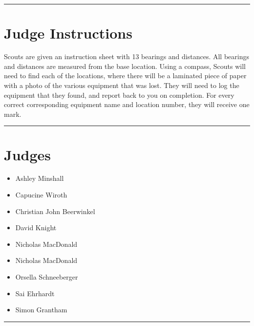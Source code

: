 \documentclass[10pt]{article}
\begin{document}
	\vspace{0.5cm}
	\hrule
	\vspace{0.5cm}

		\section*{Judge Instructions}
		Scouts are given an instruction sheet with 13 bearings and distances. All bearings and distances are measured from the base location. Using a compass, Scouts will need to find each of the locations, where there will be a laminated piece of paper with a photo of the various equipment that was lost. They will need to log the equipment that they found, and report back to you on completion. For every correct corresponding equipment name and location number, they will receive one mark.
\vspace{0.5cm}
	\hrule
	\vspace{0.5cm}
		\section*{\faUsers \: Judges}

		

	\begin{multicols}{2}

		\begin{itemize}
									\item Ashley Minshall
									\item Capucine Wiroth
									\item Christian John Beerwinkel
									\item David Knight
									\item Nicholas MacDonald
						\end{itemize}

		\vfill\null
		\columnbreak

		\begin{itemize}
									\item Nicholas MacDonald
									\item Orsella Schneeberger
									\item Sai Ehrhardt
									\item Simon Grantham
						\end{itemize}

		\vfill\null

		\end{multicols}



			\vspace{0.5cm}
	\hrule
	\vspace{0.5cm}
\end{document}
